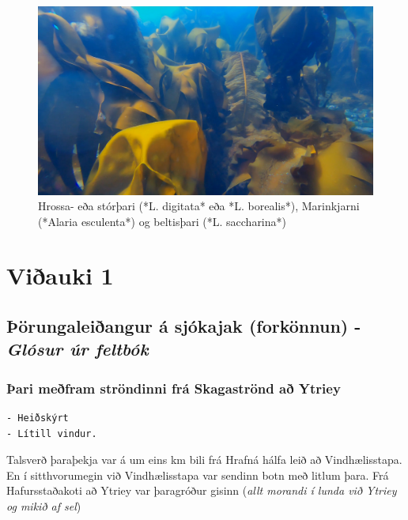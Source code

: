 \documentclass[icelandic,]{book}
\begin{document}
\begin{figure}

{\centering \includegraphics[width=1\linewidth]{skjol/skogar/sk1/stodvar/st1/sk1-st1B} 

}

\caption{Hrossa- eða stórþari (*L. digitata* eða *L. borealis*), Marinkjarni (*Alaria esculenta*) og beltisþari (*L. saccharina*)}\label{fig:mynd-sk-eitt-stod-eittB}
\end{figure}

\hypertarget{v1}{%
\chapter{Viðauki 1}\label{v1}}

\hypertarget{orungaleiangur-a-sjokajak-forkonnun---glosur-ur-feltbok}{%
\section{\texorpdfstring{Þörungaleiðangur á sjókajak (forkönnun) - \emph{Glósur úr feltbók}}{Þörungaleiðangur á sjókajak (forkönnun) - Glósur úr feltbók}}\label{orungaleiangur-a-sjokajak-forkonnun---glosur-ur-feltbok}}

\hypertarget{ari-mefram-strondinni-fra-skagastrond-a-ytriey}{%
\subsection{Þari meðfram ströndinni frá Skagaströnd að Ytriey}\label{ari-mefram-strondinni-fra-skagastrond-a-ytriey}}

\begin{verbatim}
- Heiðskýrt
- Lítill vindur.
\end{verbatim}

Talsverð þaraþekja var á um eins km bili frá Hrafná hálfa leið að Vindhælisstapa. En í sitthvorumegin við Vindhælisstapa var sendinn botn með litlum þara. Frá Hafursstaðakoti að Ytriey var þaragróður gisinn (\emph{allt morandi í lunda við Ytriey og mikið af sel})
\end{document}

